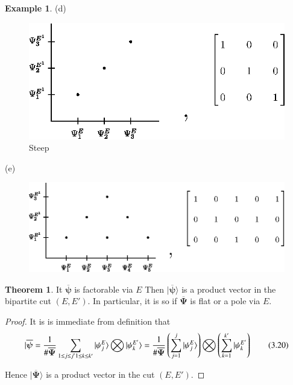 \documentclass[a4paper,12pt]{article}
\theoremstyle{definition}
\theoremstyle{underlinethm}
\newtheorem{thm}{Theorem}[section]
\newtheorem{example}{Example}[section]
\theoremstyle{definition}
\begin{document}
\begin{example}
\newpage

(d)
\begin{figure}[h]
\centering
\includegraphics[scale=1.2]{figure/fig7.eps}
\caption{Steep}\label{fig07}
\end{figure}

(e)
\begin{figure}[h]
\centering
\includegraphics[scale=1]{figure/fig8.eps}
\caption{}\label{fig05}
\end{figure}

\end{example}

\begin{thm}\label{thm-3.3}
It $\overline{\boldsymbol{\psi}}$ is factorable via $E$ Then $| \overline{\boldsymbol{\psi}} \rangle$ is a product vector in the bipartite cut $(E, E')$. In particular, it is so if $\overline{\boldsymbol{\Psi}}$ is flat or a pole via $E$.
\end{thm}

\begin{proof}
It is is immediate from definition that 
\begin{equation}
| \overline{\boldsymbol{\psi}} = \frac{1}{\# \overline{\boldsymbol{\Psi}}} \sum_{\substack{1 \leq j \leq j'}\\ 1 \leq k \leq k'} | \psi^{E}_{j} \rangle \bigotimes | \psi_{k}^{E'} \rangle = \frac{1}{\# \overline{\boldsymbol{\Psi}}}\left(\sum_{j=1}^{j} | \psi_{j}^{E} \rangle\right) \bigotimes \left(\sum_{k=1}^{k'} | \psi_{k}^{E'}\right) \tag{3.20}\label{eq-3.20}
\end{equation}

Hence $| \overline{\boldsymbol{\Psi}}\rangle$ is a product vector in the cut $(E, E')$.

\end{proof}
\end{document}
